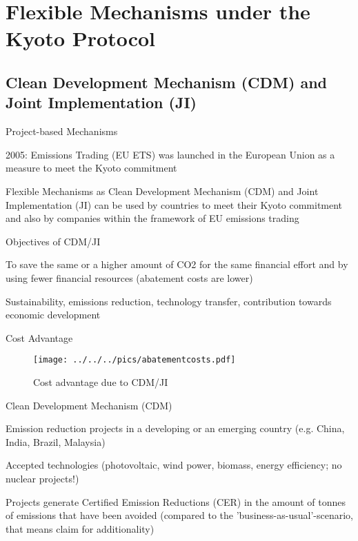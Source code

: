 \section{Flexible Mechanisms under the Kyoto Protocol}
\subsection{Clean Development Mechanism (CDM) and Joint Implementation (JI)}

{Project-based Mechanisms}


	2005:  Emissions Trading (EU ETS) was launched in the European Union as a measure to meet the Kyoto commitment

	Flexible Mechanisms as Clean Development Mechanism (CDM) and Joint Implementation (JI) can be used by countries to meet their Kyoto commitment and also by companies within the framework of EU emissions trading


Objectives of CDM/JI


	To save the same or a higher amount of CO2 for the same financial effort and by using fewer financial resources (abatement costs are lower)

	Sustainability, emissions reduction, technology transfer, contribution towards economic development


{Cost Advantage}
\begin{figure}[h!]
\centering
\texttt{[image: ../../../pics/abatementcosts.pdf]}
\caption{Cost advantage due to CDM/JI}
\label{fig:CDM/JI}
\end{figure}


{Clean Development Mechanism (CDM)}


	 Emission reduction projects in a developing or an emerging country (e.g. China, India, Brazil, Malaysia)

	 Accepted technologies (photovoltaic, wind power, biomass, energy efficiency; no nuclear projects!)

	 Projects generate Certified Emission Reductions (CER) in the amount of tonnes of emissions that have been avoided (compared to the 'business-as-usual'-scenario, that means claim for additionality)

